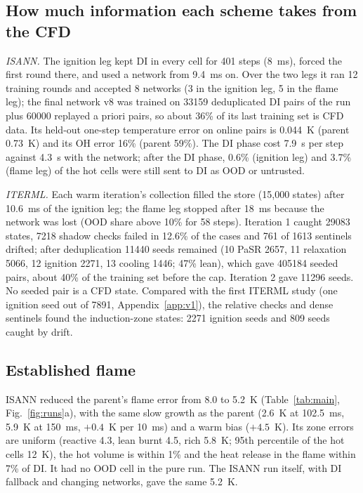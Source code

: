 \documentclass[preprint,review,12pt]{elsarticle}
\begin{document}
\subsection{How much information each scheme takes from the CFD}
\label{sec:data}
\emph{ISANN.} The ignition leg kept DI in every cell for 401 steps (8~ms), forced the first round there, and
used a network from 9.4~ms on. Over the two legs it ran 12 training rounds and accepted 8 networks (3 in the
ignition leg, 5 in the flame leg); the final network v8 was trained on \num{33159} deduplicated DI pairs of
the run plus \num{60000} replayed a priori pairs, so about 36\% of its last training set is CFD data. Its
held-out one-step temperature error on online pairs is 0.044~K (parent 0.73~K) and its OH error 16\%
(parent 59\%). The DI phase cost 7.9~s per step against 4.3~s with the network; after the DI phase, 0.6\%
(ignition leg) and 3.7\% (flame leg) of the hot cells were still sent to DI as OOD or untrusted.

\emph{ITERML.} Each warm iteration's collection filled the store (15,000 states) after 10.6~ms of the
ignition leg; the flame leg stopped after 18~ms because the network was lost (OOD share above 10\% for 58
steps). Iteration 1 caught \num{29083} states, 7218 shadow checks failed in 12.6\% of the cases and 761 of
1613 sentinels drifted; after deduplication \num{11440} seeds remained (10 PaSR 2657, 11 relaxation 5066,
12 ignition 2271, 13 cooling 1446; 47\% lean), which gave \num{405184} seeded pairs, about 40\% of the
training set before the cap. Iteration 2 gave \num{11296} seeds. No seeded pair is a CFD state. Compared with
the first ITERML study (one ignition seed out of \num{7891}, Appendix~\ref{app:v1}), the relative checks and
dense sentinels found the induction-zone states: 2271 ignition seeds and 809 seeds caught by drift.

\subsection{Established flame}
\label{sec:flame}
ISANN reduced the parent's flame error from 8.0 to 5.2~K (Table~\ref{tab:main}, Fig.~\ref{fig:runs}a), with
the same slow growth as the parent (2.6~K at 102.5~ms, 5.9~K at 150~ms, $+0.4$~K per 10~ms) and a warm bias
($+4.5$~K). Its zone errors are uniform (reactive 4.3, lean burnt 4.5, rich 5.8~K; 95th percentile of the
hot cells 12~K), the hot volume is within 1\% and the heat release in the flame within 7\% of DI. It had no
OOD cell in the pure run. The ISANN run itself, with DI fallback and changing networks, gave the same 5.2~K.
\end{document}
